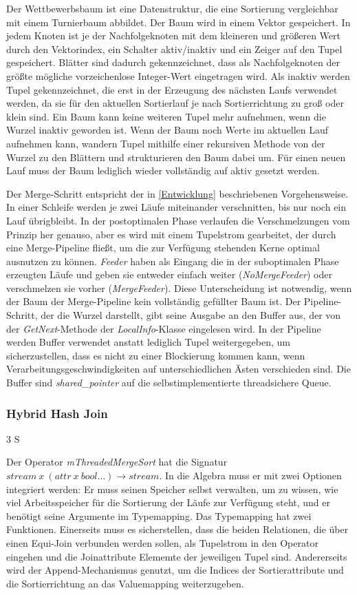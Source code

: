 \documentclass[a4paper,12pt,twoside]{article}
\newcommand{\Fb}[1]{\textit{#1}} %
\begin{document}
Der Wettbewerbsbaum ist eine Datenstruktur, die eine Sortierung vergleichbar mit einem Turnierbaum abbildet. Der Baum wird in einem Vektor gespeichert. In jedem Knoten ist je der Nachfolgeknoten mit dem kleineren und größeren Wert durch den Vektorindex, ein Schalter aktiv/inaktiv und ein Zeiger auf den Tupel gespeichert. Blätter sind dadurch gekennzeichnet, dass als Nachfolgeknoten der größte mögliche vorzeichenlose Integer-Wert eingetragen wird. Als inaktiv werden Tupel gekennzeichnet, die erst in der Erzeugung des nächsten Laufs verwendet werden, da sie für den aktuellen Sortierlauf je nach Sortierrichtung zu groß oder klein sind. Ein Baum kann keine weiteren Tupel mehr aufnehmen, wenn die Wurzel inaktiv geworden ist. Wenn der Baum noch Werte im aktuellen Lauf aufnehmen kann, wandern Tupel mithilfe einer rekursiven Methode von der Wurzel zu den Blättern und strukturieren den Baum dabei um. Für einen neuen Lauf muss der Baum lediglich wieder vollständig auf aktiv gesetzt werden. 

Der Merge-Schritt entspricht der in \autoref{Entwicklung} beschriebenen Vorgehensweise. In einer Schleife werden je zwei Läufe miteinander verschnitten, bis nur noch ein Lauf übrigbleibt. In der postoptimalen Phase verlaufen die Verschmelzungen vom Prinzip her genauso, aber es wird mit einem Tupelstrom gearbeitet, der durch eine Merge-Pipeline fließt, um die zur Verfügung stehenden Kerne optimal ausnutzen zu können. \Fb{Feeder} haben als Eingang die in der suboptimalen Phase erzeugten Läufe und geben sie entweder einfach weiter (\Fb{NoMergeFeeder}) oder verschmelzen sie vorher (\Fb{MergeFeeder}). Diese Unterscheidung ist notwendig, wenn der Baum der Merge-Pipeline kein vollständig gefüllter Baum ist. Der Pipeline-Schritt, der die Wurzel darstellt, gibt seine Ausgabe an den Buffer aus, der von der \Fb{GetNext}-Methode der \Fb{LocalInfo}-Klasse eingelesen wird. In der Pipeline werden Buffer verwendet anstatt lediglich Tupel weitergegeben, um sicherzustellen, dass es nicht zu einer Blockierung kommen kann, wenn Verarbeitungsgeschwindigkeiten auf unterschiedlichen Ästen verschieden sind. Die Buffer sind \Fb{shared\_pointer} auf die selbstimplementierte threadsichere Queue.  


\subsubsection{Hybrid Hash Join} 3 S

Der Operator \Fb{mThreadedMergeSort} hat die Signatur $stream~x~(attr~x~bool \ldots) \longrightarrow stream$. In die Algebra muss er mit zwei Optionen integriert werden: Er muss seinen Speicher selbst verwalten, um zu wissen, wie viel Arbeitsspeicher für die Sortierung der Läufe zur Verfügung steht, und er benötigt seine Argumente im Typemapping. Das Typemapping hat zwei Funktionen. Einerseits muss es sicherstellen, dass die beiden Relationen, die über einen Equi-Join verbunden werden sollen, als Tupelstrom in den Operator eingehen und die Joinattribute Elememte der jeweiligen Tupel sind. Andererseits wird der Append-Mechanismus genutzt, um die Indices der Sortierattribute und die Sortierrichtung an das Valuemapping weiterzugeben.
\end{document}
